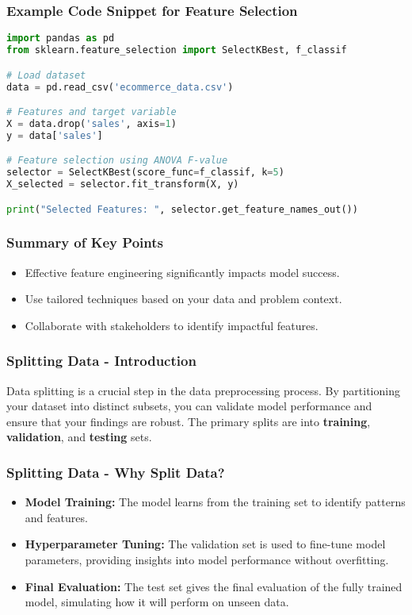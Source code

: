 \documentclass[aspectratio=169]{beamer}
\begin{document}
\begin{frame}[fragile]
    \frametitle{Example Code Snippet for Feature Selection}
    \begin{lstlisting}[language=Python]
import pandas as pd
from sklearn.feature_selection import SelectKBest, f_classif

# Load dataset
data = pd.read_csv('ecommerce_data.csv')

# Features and target variable
X = data.drop('sales', axis=1)
y = data['sales']

# Feature selection using ANOVA F-value
selector = SelectKBest(score_func=f_classif, k=5)
X_selected = selector.fit_transform(X, y)

print("Selected Features: ", selector.get_feature_names_out())
    \end{lstlisting}
\end{frame}

\begin{frame}
    \frametitle{Summary of Key Points}
    \begin{itemize}
        \item Effective feature engineering significantly impacts model success.
        \item Use tailored techniques based on your data and problem context.
        \item Collaborate with stakeholders to identify impactful features.
    \end{itemize}
\end{frame}

\begin{frame}[fragile]
    \frametitle{Splitting Data - Introduction}
    Data splitting is a crucial step in the data preprocessing process. By partitioning your dataset into distinct subsets, you can validate model performance and ensure that your findings are robust. The primary splits are into \textbf{training}, \textbf{validation}, and \textbf{testing} sets.
\end{frame}

\begin{frame}[fragile]
    \frametitle{Splitting Data - Why Split Data?}
    \begin{itemize}
        \item \textbf{Model Training:} The model learns from the training set to identify patterns and features.
        \item \textbf{Hyperparameter Tuning:} The validation set is used to fine-tune model parameters, providing insights into model performance without overfitting.
        \item \textbf{Final Evaluation:} The test set gives the final evaluation of the fully trained model, simulating how it will perform on unseen data.
    \end{itemize}
\end{frame}
\end{document}
